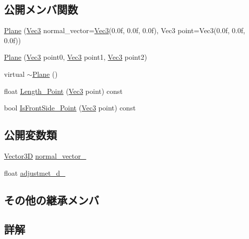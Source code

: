 \subsection*{公開メンバ関数}
\begin{DoxyCompactItemize}
\item 
\mbox{\hyperlink{class_plane_a026c307dff6ed919b337f1ed7e579798}{Plane}} (\mbox{\hyperlink{_vector3_d_8h_ab16f59e4393f29a01ec8b9bbbabbe65d}{Vec3}} normal\+\_\+vector=\mbox{\hyperlink{_vector3_d_8h_ab16f59e4393f29a01ec8b9bbbabbe65d}{Vec3}}(0.\+0f, 0.\+0f, 0.\+0f), Vec3 point=\+Vec3(0.\+0f, 0.\+0f, 0.\+0f))
\item 
\mbox{\hyperlink{class_plane_a9554deff9f83d09a772c15bca3d468d5}{Plane}} (\mbox{\hyperlink{_vector3_d_8h_ab16f59e4393f29a01ec8b9bbbabbe65d}{Vec3}} point0, \mbox{\hyperlink{_vector3_d_8h_ab16f59e4393f29a01ec8b9bbbabbe65d}{Vec3}} point1, \mbox{\hyperlink{_vector3_d_8h_ab16f59e4393f29a01ec8b9bbbabbe65d}{Vec3}} point2)
\item 
virtual \mbox{\hyperlink{class_plane_a69abd86051c880dcb44b249ad10c4436}{$\sim$\+Plane}} ()
\item 
float \mbox{\hyperlink{class_plane_af0315d2a7aebf6057410799f127b6c17}{Length\+\_\+\+Point}} (\mbox{\hyperlink{_vector3_d_8h_ab16f59e4393f29a01ec8b9bbbabbe65d}{Vec3}} point) const
\item 
bool \mbox{\hyperlink{class_plane_afb752b43ee18e5e99f2682595d35fd87}{Is\+Front\+Side\+\_\+\+Point}} (\mbox{\hyperlink{_vector3_d_8h_ab16f59e4393f29a01ec8b9bbbabbe65d}{Vec3}} point) const
\end{DoxyCompactItemize}
\subsection*{公開変数類}
\begin{DoxyCompactItemize}
\item 
\mbox{\hyperlink{class_vector3_d}{Vector3D}} \mbox{\hyperlink{class_plane_abdf97ffa29f452b0faaae0b7d06f4ee5}{normal\+\_\+vector\+\_\+}}
\item 
float \mbox{\hyperlink{class_plane_ab43e3263bd879ea710936d85cacb6006}{adjustmet\+\_\+d\+\_\+}}
\end{DoxyCompactItemize}
\subsection*{その他の継承メンバ}


\subsection{詳解}


